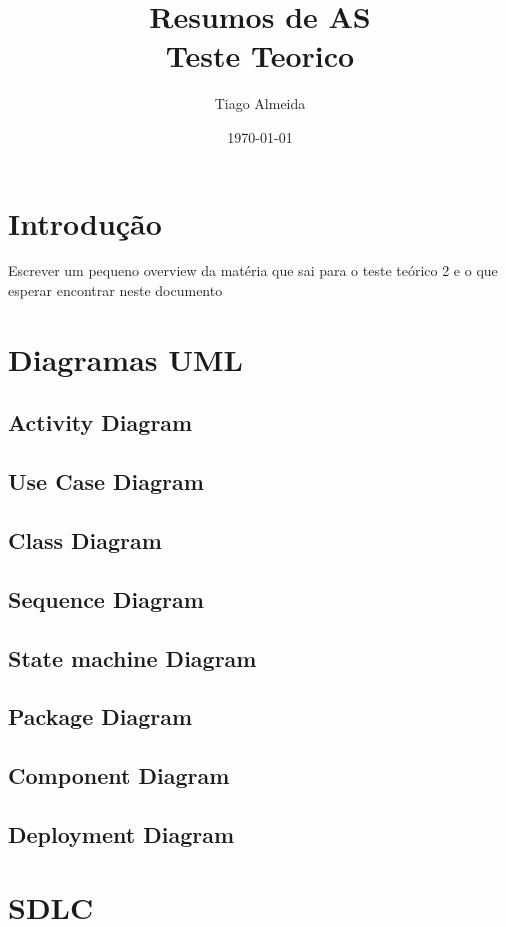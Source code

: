 \documentclass[a4paper, 12pt, onecolumn, oneside]{scrartcl}
\title{%
  Resumos de AS \\
  \large Teste Teorico}
\author{Tiago Almeida}
\date{\today}
\begin{document}
\maketitle

\tableofcontents

\section{Introdução}
Escrever um pequeno overview da matéria que sai para o teste teórico 2
e o que esperar encontrar neste documento

\section{Diagramas UML}

\subsection{Activity Diagram}
\subsection{Use Case Diagram}
\subsection{Class Diagram}
\subsection{Sequence Diagram}
\subsection{State machine Diagram}
\subsection{Package Diagram}
\subsection{Component Diagram}
\subsection{Deployment Diagram}

\section{SDLC}
\end{document}
